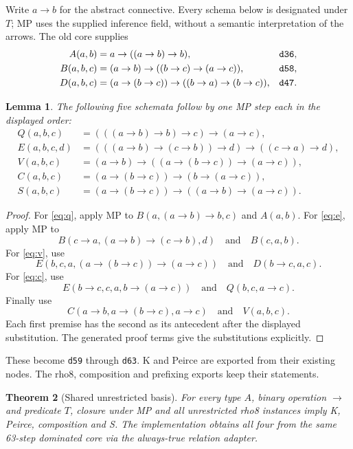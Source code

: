 \documentclass[11pt,letterpaper]{article}
\newcommand{\code}[1]{\texttt{#1}}
\newtheorem{theorem}{Theorem}[section]
\newtheorem{lemma}[theorem]{Lemma}
\begin{document}
Write \(a\to b\) for the abstract connective. Every schema below is designated
under \(T\); MP uses the supplied inference field, without a semantic
interpretation of the arrows. The old core supplies
\begin{align*}
 A(a,b)&=a\to((a\to b)\to b), &&\text{\code{d36}},\\
 B(a,b,c)&=(a\to b)\to((b\to c)\to(a\to c)), &&\text{\code{d58}},\\
 D(a,b,c)&=(a\to(b\to c))\to((b\to a)\to(b\to c)), &&\text{\code{d47}}.
\end{align*}

\begin{lemma}
The following five schemata follow by one MP step each in the displayed order:
\begin{align}
 Q(a,b,c)&=(((a\to b)\to b)\to c)\to(a\to c),\label{eq:q}\\
 E(a,b,c,d)&=(((a\to b)\to(c\to b))\to d)\to((c\to a)\to d),\label{eq:e}\\
 V(a,b,c)&=(a\to b)\to((a\to(b\to c))\to(a\to c)),\label{eq:v}\\
 C(a,b,c)&=(a\to(b\to c))\to(b\to(a\to c)),\label{eq:c}\\
 S(a,b,c)&=(a\to(b\to c))\to((a\to b)\to(a\to c)).\label{eq:s}
\end{align}
\end{lemma}

\begin{proof}
For \eqref{eq:q}, apply MP to
\(B(a,(a\to b)\to b,c)\) and \(A(a,b)\).
For \eqref{eq:e}, apply MP to
\[
 B(c\to a,(a\to b)\to(c\to b),d)
 \quad\text{and}\quad B(c,a,b).
\]
For \eqref{eq:v}, use
\[
 E(b,c,a,(a\to(b\to c))\to(a\to c))
 \quad\text{and}\quad D(b\to c,a,c).
\]
For \eqref{eq:c}, use
\[
 E(b\to c,c,a,b\to(a\to c))
 \quad\text{and}\quad Q(b,c,a\to c).
\]
Finally use
\[
 C(a\to b,a\to(b\to c),a\to c)
 \quad\text{and}\quad V(a,b,c).
\]
Each first premise has the second as its antecedent after the displayed
substitution. The generated proof terms give the substitutions explicitly.
\end{proof}

These become \code{d59} through \code{d63}. K and Peirce are exported from their
existing nodes. The rho8, composition and prefixing exports keep their statements.

\begin{theorem}[Shared unrestricted basis]
For every type \(A\), binary operation \(\to\) and predicate \(T\), closure under
MP and all unrestricted rho8 instances imply K, Peirce, composition and S.
The implementation obtains all four from the same 63-step dominated core via
the always-true relation adapter.
\end{theorem}
\end{document}
